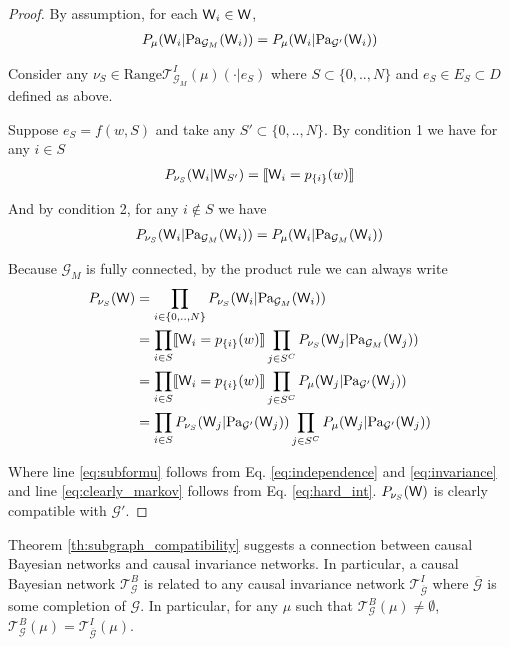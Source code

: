 \begin{proof}
By assumption, for each $\mathsf{W}_i\in \mathsf{W}$,
\begin{align}
    P_\mu(\mathsf{W}_i|\text{Pa}_{\mathcal{G}_M}(\mathsf{W}_i)) = P_\mu(\mathsf{W}_i|\text{Pa}_{\mathcal{G}'}(\mathsf{W}_i)) \label{eq:independence}
\end{align}

Consider any $\nu_S\in \text{Range}\mathscr{T}^{I}_{\mathcal{G}_M}(\mu)(\cdot|e_S)$ where $S\subset\{0,..,N\}$ and $e_S\in E_S\subset D$ defined as above.

Suppose $e_S=f(w,S)$ and take any $S'\subset\{0,..,N\}$. By condition 1 we have for any $i\in S$
\begin{align}
    P_{\nu_S}(\mathsf{W}_i|\mathsf{W}_{S'}) = \llbracket \mathsf{W}_i = p_{\{i\}}(w) \rrbracket \label{eq:hard_int}
\end{align}

And by condition 2, for any $i\not\in S$ we have
\begin{align}
    P_{\nu_S}(\mathsf{W}_i|\text{Pa}_{\mathcal{G}_M}(\mathsf{W}_i)) =P_\mu(\mathsf{W}_i|\text{Pa}_{\mathcal{G}_M}(\mathsf{W}_i)) \label{eq:invariance}
\end{align}

Because $\mathcal{G}_M$ is fully connected, by the product rule we can always write
\begin{align}
    P_{\nu_S}(\mathsf{W}) &= \prod_{i\in \{0,..,N\}} P_{\nu_S}(\mathsf{W}_i|\text{Pa}_{\mathcal{G}_M}(\mathsf{W}_i))\\
                      &= \prod_{i\in S}\llbracket \mathsf{W}_i = p_{\{i\}}(w) \rrbracket \prod_{j\in S^C}P_{\nu_S}(\mathsf{W}_j|\text{Pa}_{\mathcal{G}_M}(\mathsf{W}_j))\\
                      &= \prod_{i\in S}\llbracket \mathsf{W}_i = p_{\{i\}}(w) \rrbracket \prod_{j\in S^C}P_{\mu}(\mathsf{W}_j|\text{Pa}_{\mathcal{G}'}(\mathsf{W}_j))\label{eq:subformu}\\
                      &= \prod_{i\in S}P_{\nu_S}(\mathsf{W}_j|\text{Pa}_{\mathcal{G}'}(\mathsf{W}_j)) \prod_{j\in S^C}P_{\mu}(\mathsf{W}_j|\text{Pa}_{\mathcal{G}'}(\mathsf{W}_j)) \label{eq:clearly_markov}
\end{align}

Where line \ref{eq:subformu} follows from Eq. \ref{eq:independence} and \ref{eq:invariance} and line \ref{eq:clearly_markov} follows from Eq. \ref{eq:hard_int}. $P_{\nu_S}(\mathsf{W})$ is clearly compatible with $\mathcal{G}'$.
\end{proof}

Theorem \ref{th:subgraph_compatibility} suggests a connection between causal Bayesian networks and causal invariance networks. In particular, a causal Bayesian network $\mathscr{T}^B_\mathcal{G}$ is related to any causal invariance network $\mathscr{T}^I_{\overline{\mathcal{G}}}$ where $\overline{\mathcal{G}}$ is some completion of $\mathcal{G}$. In particular, for any $\mu$ such that $\mathscr{T}^B_\mathcal{G}(\mu)\neq \emptyset$, $\mathscr{T}^B_\mathcal{G}(\mu)=\mathscr{T}^I_{\overline{\mathcal{G}}}(\mu)$.


